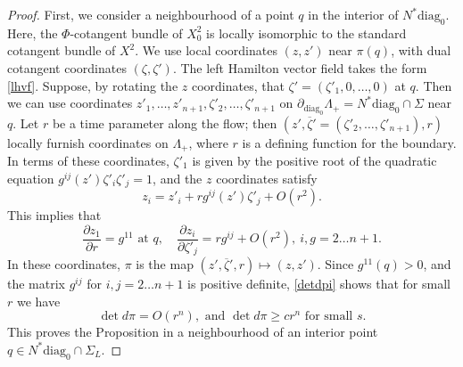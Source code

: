 \documentclass[10pt, a4paper, twoside]{amsart}
\numberwithin{equation}{section}
\theoremstyle{remark}
\begin{document}
\begin{proof}
First, we consider a neighbourhood of a point $q$ in the interior of $N^* {\mathrm{diag}_0}$. Here, the $\Phi$-cotangent bundle of $X^2_0$ is locally isomorphic to the standard cotangent bundle of $X^2$. We use local coordinates $(z, z')$ near $\pi(q)$, with dual cotangent coordinates $(\zeta, \zeta')$. The left Hamilton vector field takes the form \eqref{lhvf}.
Suppose, by rotating the $z$ coordinates, that $\zeta' = (\zeta'_1, 0, \dots, 0)$ at $q$. Then we can use coordinates $z'_1, \dots, z'_{n+1}, \zeta'_2, \dots, \zeta'_{n+1}$ on $\partial_{\mathrm{diag}_0} \Lambda_+ = N^* {\mathrm{diag}_0} \cap \Sigma$ near $q$. Let $r$ be a time parameter along the flow; then $(z', \overline{\zeta}' = (\zeta'_2, \dots, \zeta'_{n+1}), r)$ locally furnish coordinates on $\Lambda_+$, where $r$ is a defining function for the boundary. In terms of these coordinates, $\zeta'_1$ is given by the positive root of the quadratic equation $g^{ij}(z') \zeta'_i \zeta'_j = 1$, and
 the $z$ coordinates satisfy
\begin{equation}
z_i = z'_i + r g^{ij}(z') \zeta'_j + O(r^2).
\end{equation}
This implies that
\begin{equation}
\frac{\partial z_1}{\partial r} = g^{11} \text{ at } q,  \quad \frac{\partial z_i}{\partial \zeta'_j} = r g^{ij} + O(r^2), \ i, g  = 2 \dots n+1.
\label{detdpi}\end{equation}
In these coordinates, $\pi$ is the map $(z', \overline{\zeta}', r) \mapsto (z, z')$. Since $g^{11}(q) > 0$, and  the matrix $g^{ij}$ for $i, j = 2 \dots n+1$ is positive definite, \eqref{detdpi} shows that for small $r$ we have
\begin{equation}
\det d\pi = O(r^n), \text{ and } \det d\pi  \geq c r^n \text{ for small } s.
\label{rn}\end{equation}
This proves the Proposition in a neighbourhood of an interior point $q \in N^* {\mathrm{diag}_0} \cap \Sigma_L$.


\end{proof}
\end{document}
